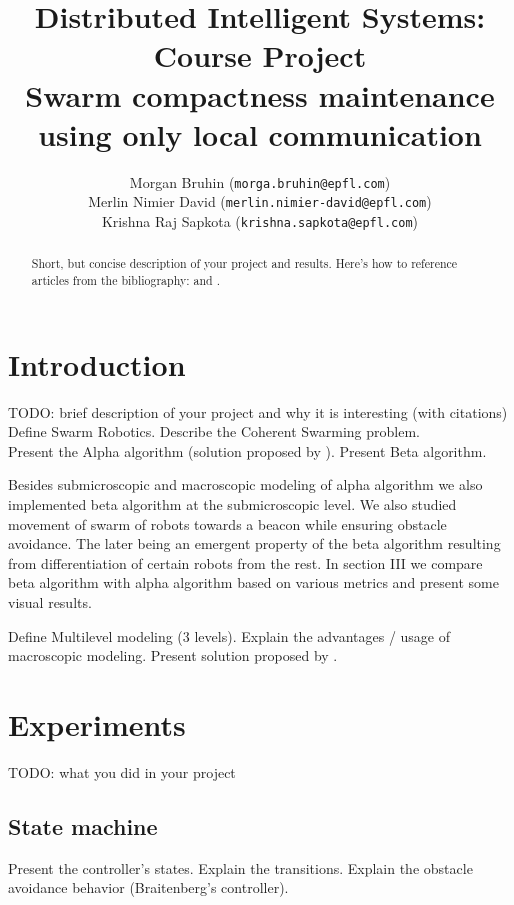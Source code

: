 \documentclass[a4paper, 10pt, conference]{ieeeconf}
\title{ %
  Distributed Intelligent Systems: Course Project\\
  Swarm compactness maintenance using only local communication
}
\author{
  Morgan Bruhin (\texttt{morga.bruhin@epfl.com}) \\
  Merlin Nimier David (\texttt{merlin.nimier-david@epfl.com}) \\
  Krishna Raj Sapkota (\texttt{krishna.sapkota@epfl.com})
}
\begin{document}
\maketitle
\thispagestyle{empty}
\pagestyle{empty}

\begin{abstract}
  Short, but concise description of your project and results.
  Here's how to reference articles from the bibliography: \cite{Nembrini02} and \cite{Winfield08}.
\end{abstract}

\section{Introduction}
  TODO: brief description of your project and why it is interesting (with citations)\\

  Define Swarm Robotics. Describe the Coherent Swarming problem.\\

  Present the Alpha algorithm (solution proposed by \cite{Nembrini02}). Present Beta algorithm.

  Besides submicroscopic and macroscopic modeling of alpha algorithm we also implemented beta algorithm at the submicroscopic level. We also studied movement of swarm of robots towards a beacon while ensuring obstacle avoidance. The later being an emergent property of the beta algorithm resulting from differentiation of certain robots from the rest. In section III we compare beta algorithm with alpha algorithm based on various metrics and present some visual results.


  Define Multilevel modeling (3 levels). Explain the advantages / usage of macroscopic modeling. Present solution proposed by \cite{Winfield08}.


\section{Experiments}
  TODO: what you did in your project\\

  \subsection{State machine}
  Present the controller's states. Explain the transitions. Explain the obstacle avoidance behavior (Braitenberg's controller).
\end{document}
